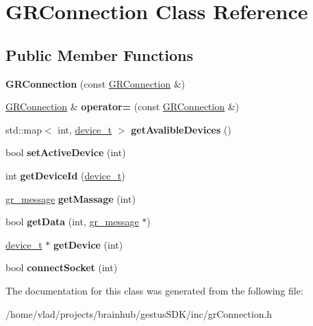 \hypertarget{classGRConnection}{}\section{G\+R\+Connection Class Reference}
\label{classGRConnection}
\subsection*{Public Member Functions}
\begin{DoxyCompactItemize}
\item 
\mbox{\label{classGRConnection_a6ed68a1cdf75f13104f4177124da552e}} 
{\bfseries G\+R\+Connection} (const \mbox{\hyperlink{classGRConnection}{G\+R\+Connection}} \&)
\item 
\mbox{\label{classGRConnection_af8942a92c8f78de15fd67b60bc975ac9}} 
\mbox{\hyperlink{classGRConnection}{G\+R\+Connection}} \& {\bfseries operator=} (const \mbox{\hyperlink{classGRConnection}{G\+R\+Connection}} \&)
\item 
\mbox{\label{classGRConnection_aaa49acf7ae219dddcf39d0fba99ae357}} 
std\+::map$<$ int, \mbox{\hyperlink{structdevice__t}{device\+\_\+t}} $>$ {\bfseries get\+Avalible\+Devices} ()
\item 
\mbox{\label{classGRConnection_a3a64dcc39afe096f83f3c6a6476359f3}} 
bool {\bfseries set\+Active\+Device} (int)
\item 
\mbox{\label{classGRConnection_a2cafff531babf3c0e11f1b37a2e0a35c}} 
int {\bfseries get\+Device\+Id} (\mbox{\hyperlink{structdevice__t}{device\+\_\+t}})
\item 
\mbox{\label{classGRConnection_a6dbdd7852ad0c77990ef6c7c0888f3b9}} 
\mbox{\hyperlink{structgr__message}{gr\+\_\+message}} {\bfseries get\+Massage} (int)
\item 
\mbox{\label{classGRConnection_af28a5f24a229c9f85e2a2da8c98f14b8}} 
bool {\bfseries get\+Data} (int, \mbox{\hyperlink{structgr__message}{gr\+\_\+message}} $\ast$)
\item 
\mbox{\label{classGRConnection_ae5b445431ae7c77a2f206ae0d3cb541d}} 
\mbox{\hyperlink{structdevice__t}{device\+\_\+t}} $\ast$ {\bfseries get\+Device} (int)
\item 
\mbox{\label{classGRConnection_aad1335f966c22c9c12538707ed94649a}} 
bool {\bfseries connect\+Socket} (int)
\end{DoxyCompactItemize}


The documentation for this class was generated from the following file\+:\begin{DoxyCompactItemize}
\item 
/home/vlad/projects/brainhub/gestus\+S\+D\+K/inc/gr\+Connection.\+h\end{DoxyCompactItemize}
